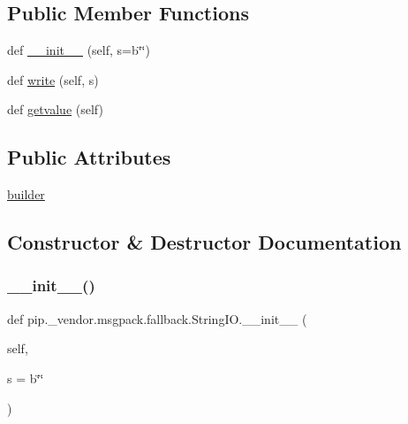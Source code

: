 \subsection*{Public Member Functions}
\begin{DoxyCompactItemize}
\item 
def \hyperlink{classpip_1_1__vendor_1_1msgpack_1_1fallback_1_1StringIO_af2d331de00f8f5186d8e231bc68a3868}{\+\_\+\+\_\+init\+\_\+\+\_\+} (self, s=b\char`\"{}\char`\"{})
\item 
def \hyperlink{classpip_1_1__vendor_1_1msgpack_1_1fallback_1_1StringIO_a564ce63dde305c954fc10902761c6f56}{write} (self, s)
\item 
def \hyperlink{classpip_1_1__vendor_1_1msgpack_1_1fallback_1_1StringIO_a904a1d9be5e5f9dd28d5d856fe9d5142}{getvalue} (self)
\end{DoxyCompactItemize}
\subsection*{Public Attributes}
\begin{DoxyCompactItemize}
\item 
\hyperlink{classpip_1_1__vendor_1_1msgpack_1_1fallback_1_1StringIO_ac62b006dadc85b91c986ca9e9fad541a}{builder}
\end{DoxyCompactItemize}


\subsection{Constructor \& Destructor Documentation}
\mbox{\label{classpip_1_1__vendor_1_1msgpack_1_1fallback_1_1StringIO_af2d331de00f8f5186d8e231bc68a3868}} 
\subsubsection{\texorpdfstring{\+\_\+\+\_\+init\+\_\+\+\_\+()}{\_\_init\_\_()}}
{\footnotesize\ttfamily def pip.\+\_\+vendor.\+msgpack.\+fallback.\+String\+I\+O.\+\_\+\+\_\+init\+\_\+\+\_\+ (\begin{DoxyParamCaption}\item[{}]{self,  }\item[{}]{s = {\ttfamily b\char`\"{}\char`\"{}} }\end{DoxyParamCaption})}



